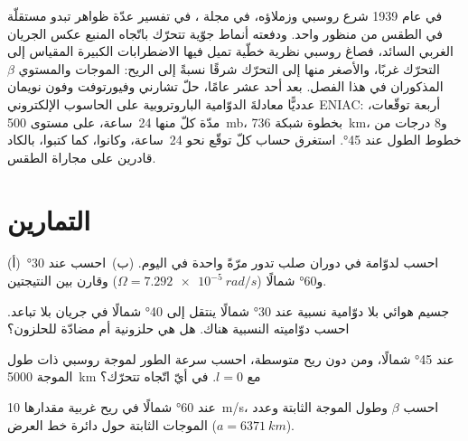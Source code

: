 \begin{history}
في عام 1939 شرع روسبي وزملاؤه، في مجلة
\emph{}، في تفسير عدّة ظواهر تبدو مستقلّة في الطقس
من منظور واحد. ودفعته أنماط جوّية تتحرّك باتّجاه المنبع
عكس الجريان الغربي السائد، فصاغ روسبي
نظرية خطّية تميل فيها الاضطرابات الكبيرة المقياس إلى التحرّك غربًا،
والأصغر منها إلى التحرّك شرقًا نسبةً إلى الريح: الموجات والمستوي $\beta$ المذكوران في هذا الفصل.
بعد أحد عشر عامًا، حلّ تشارني وفيورتوفت وفون نويمان عدديًّا معادلةَ الدوّامية الباروتروبية
على الحاسوب الإلكتروني ENIAC: أربعة توقّعات، مدّة كلّ منها 24~ساعة، على مستوى
\qty{500}{mb}، بخطوة شبكة \qty{736}{km}، و8 درجات من خطوط الطول عند \ang{45}.
استغرق حساب كلّ توقّع نحو 24~ساعة،
وكانوا، كما كتبوا، بالكاد قادرين
على مجاراة الطقس.
\end{history}

\section{التمارين}

\begin{exercise}[$\star$]\label{exo:b3:atmospheric-dynamics:1}
(أ)~احسب  لدوّامة في دوران صلب تدور
مرّةً واحدة في اليوم. (ب)~احسب  عند \ang{30} و\ang{60} شمالًا
($\Omega = \qty{7.292e-5}{rad/s}$) وقارن بين النتيجتين.
\end{exercise}

\begin{exercise}[$\star$]\label{exo:b3:atmospheric-dynamics:2}
جسيم هوائي بلا دوّامية نسبية عند \ang{30} شمالًا ينتقل إلى \ang{40} شمالًا في
جريان بلا تباعد. احسب دوّاميته النسبية هناك.
هل هي حلزونية أم مضادّة للحلزون؟
\end{exercise}

\begin{exercise}[$\star$]\label{exo:b3:atmospheric-dynamics:3}
عند \ang{45} شمالًا، ومن دون ريح متوسطة، احسب سرعة الطور لموجة روسبي
ذات طول الموجة \qty{5000}{km} مع $l = 0$. في أيّ اتّجاه تتحرّك؟
\end{exercise}

\begin{exercise}[$\star$]\label{exo:b3:atmospheric-dynamics:4}
عند \ang{60} شمالًا في ريح غربية مقدارها \qty{10}{m/s}، احسب $\beta$ وطول
الموجة الثابتة وعدد الموجات الثابتة حول
دائرة خط العرض ($a = \qty{6371}{km}$).
\end{exercise}


